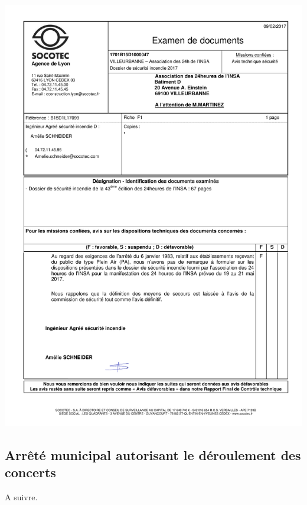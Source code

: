 \documentclass[hidelinks, paper=a4, fontsize=13pt]{report}
\begin{document}
\begin{center}
	\includegraphics[width=.75\textwidth,keepaspectratio]{Annexes/Documents/ERP2017AvisSOCOTEC}
\end{center}

\subsection{Arrêté municipal autorisant le déroulement des concerts}

A suivre. 
\end{document}
